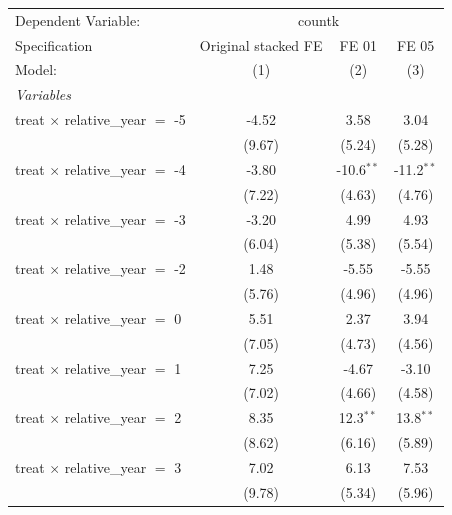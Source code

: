 
\begingroup
\centering
\begin{tabular}{lccc}
   \tabularnewline \midrule \midrule
   Dependent Variable: & \multicolumn{3}{c}{countk}\\
   Specification                          & Original stacked FE & FE 01        & FE 05 \\   
   Model:                                 & (1)                 & (2)          & (3)\\  
   \midrule
   \emph{Variables}\\
   treat $\times$ relative\_year $=$ -5   & -4.52               & 3.58         & 3.04\\   
                                          & (9.67)              & (5.24)       & (5.28)\\   
   treat $\times$ relative\_year $=$ -4   & -3.80               & -10.6$^{**}$ & -11.2$^{**}$\\   
                                          & (7.22)              & (4.63)       & (4.76)\\   
   treat $\times$ relative\_year $=$ -3   & -3.20               & 4.99         & 4.93\\   
                                          & (6.04)              & (5.38)       & (5.54)\\   
   treat $\times$ relative\_year $=$ -2   & 1.48                & -5.55        & -5.55\\   
                                          & (5.76)              & (4.96)       & (4.96)\\   
   treat $\times$ relative\_year $=$ 0    & 5.51                & 2.37         & 3.94\\   
                                          & (7.05)              & (4.73)       & (4.56)\\   
   treat $\times$ relative\_year $=$ 1    & 7.25                & -4.67        & -3.10\\   
                                          & (7.02)              & (4.66)       & (4.58)\\   
   treat $\times$ relative\_year $=$ 2    & 8.35                & 12.3$^{**}$  & 13.8$^{**}$\\   
                                          & (8.62)              & (6.16)       & (5.89)\\   
   treat $\times$ relative\_year $=$ 3    & 7.02                & 6.13         & 7.53\\   
                                          & (9.78)              & (5.34)       & (5.96)\\   

\end{tabular}
